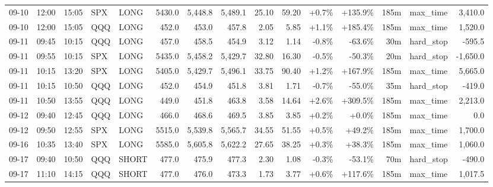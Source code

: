 \documentclass[11pt,a4paper,twoside]{article}
\begin{document}
\begin{landscape}
\begin{center}
\begin{longtable}{>{\color{txtmain}}l l l l l r r r r r r r r >{\color{txtmain}}l r}
09-10 & 12:00 & 15:05 & SPX & LONG & 5430.0 & 5,448.8 & 5,489.1 & 25.10 & 59.20 & \textcolor{wingreen}{+0.7\%} & \textcolor{wingreen}{+135.9\%} & 185m & max\_time & \textcolor{wingreen}{3,410.0} \\
09-10 & 12:00 & 15:05 & QQQ & LONG & 452.0 & 453.0 & 457.8 & 2.05 & 5.85 & \textcolor{wingreen}{+1.1\%} & \textcolor{wingreen}{+185.4\%} & 185m & max\_time & \textcolor{wingreen}{1,520.0} \\
09-11 & 09:45 & 10:15 & QQQ & LONG & 457.0 & 458.5 & 454.9 & 3.12 & 1.14 & \textcolor{lossred}{-0.8\%} & \textcolor{lossred}{-63.6\%} & 30m & hard\_stop & \textcolor{lossred}{-595.5} \\
09-11 & 09:55 & 10:15 & SPX & LONG & 5435.0 & 5,458.2 & 5,429.7 & 32.80 & 16.30 & \textcolor{lossred}{-0.5\%} & \textcolor{lossred}{-50.3\%} & 20m & hard\_stop & \textcolor{lossred}{-1,650.0} \\
09-11 & 10:15 & 13:20 & SPX & LONG & 5405.0 & 5,429.7 & 5,496.1 & 33.75 & 90.40 & \textcolor{wingreen}{+1.2\%} & \textcolor{wingreen}{+167.9\%} & 185m & max\_time & \textcolor{wingreen}{5,665.0} \\
09-11 & 10:15 & 10:50 & QQQ & LONG & 452.0 & 454.9 & 451.8 & 3.81 & 1.71 & \textcolor{lossred}{-0.7\%} & \textcolor{lossred}{-55.0\%} & 35m & hard\_stop & \textcolor{lossred}{-419.0} \\
09-11 & 10:50 & 13:55 & QQQ & LONG & 449.0 & 451.8 & 463.8 & 3.58 & 14.64 & \textcolor{wingreen}{+2.6\%} & \textcolor{wingreen}{+309.5\%} & 185m & max\_time & \textcolor{wingreen}{2,213.0} \\
09-12 & 09:40 & 12:45 & QQQ & LONG & 466.0 & 468.6 & 469.5 & 3.85 & 3.85 & \textcolor{wingreen}{+0.2\%} & \textcolor{wingreen}{+0.0\%} & 185m & max\_time & \textcolor{wingreen}{0.0} \\
09-12 & 09:50 & 12:55 & SPX & LONG & 5515.0 & 5,539.8 & 5,565.7 & 34.55 & 51.55 & \textcolor{wingreen}{+0.5\%} & \textcolor{wingreen}{+49.2\%} & 185m & max\_time & \textcolor{wingreen}{1,700.0} \\
09-16 & 10:35 & 13:40 & SPX & LONG & 5585.0 & 5,605.8 & 5,622.2 & 27.65 & 38.25 & \textcolor{wingreen}{+0.3\%} & \textcolor{wingreen}{+38.3\%} & 185m & max\_time & \textcolor{wingreen}{1,060.0} \\
09-17 & 09:40 & 10:50 & QQQ & SHORT & 477.0 & 475.9 & 477.3 & 2.30 & 1.08 & \textcolor{lossred}{-0.3\%} & \textcolor{lossred}{-53.1\%} & 70m & hard\_stop & \textcolor{lossred}{-490.0} \\
09-17 & 11:10 & 14:15 & QQQ & SHORT & 477.0 & 476.0 & 473.3 & 1.73 & 3.77 & \textcolor{wingreen}{+0.6\%} & \textcolor{wingreen}{+117.6\%} & 185m & max\_time & \textcolor{wingreen}{1,017.5} \\

\end{longtable}
\end{center}
\end{landscape}
\end{document}
